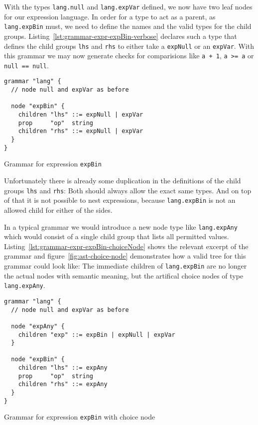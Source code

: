 \documentclass[sigconf,natbib=false,review=true]{acmart}
\begin{document}
With the types \texttt{lang.null} and \texttt{lang.expVar} defined, we now have two leaf nodes for our expression language. In order for a type to act as a parent, as \texttt{lang.expBin} must, we need to define the names and the valid types for the child groups. Listing~\ref{lst:grammar-expr-expBin-verbose} declares such a type that defines the child groups \texttt{lhs} and \texttt{rhs} to either take a \texttt{expNull} or an \texttt{expVar}. With this grammar we may now generate checks for comparisions like \texttt{a + 1}, \texttt{a >= a} or \texttt{null == null}.

\begin{listing}[H]
\begin{verbatim}
grammar "lang" {
  // node null and expVar as before

  node "expBin" {
    children "lhs" ::= expNull | expVar
    prop     "op"  string
    children "rhs" ::= expNull | expVar
  }
}
\end{verbatim}
\caption{Grammar for expression \texttt{expBin}}
\label{lst:grammar-expr-expBin-verbose}
\end{listing}

Unfortunately there is already some duplication in the definitions of the child groups \texttt{lhs} and \texttt{rhs}: Both should always allow the exact same types. And on top of that it is not possible to nest expressions, because \texttt{lang.expBin} is not an allowed child for either of the sides.

In a typical grammar we would introduce a new node type like \texttt{lang.expAny} which would consist of a single child group that lists all permitted values. Listing~\ref{lst:grammar-expr-expBin-choiceNode} shows the relevant excerpt of the grammar and figure~\ref{fig:ast-choice-node} demonstrates how a valid tree for this grammar could look like: The immediate children of \texttt{lang.expBin} are no longer the actual nodes with semantic meaning, but the artifical choice nodes of type \texttt{lang.expAny}.

\begin{listing}[H]
\begin{verbatim}
grammar "lang" {
  // node null and expVar as before

  node "expAny" {
    children "exp" ::= expBin | expNull | expVar
  }

  node "expBin" {
    children "lhs" ::= expAny
    prop     "op"  string
    children "rhs" ::= expAny
  }
}
\end{verbatim}
\caption{Grammar for expression \texttt{expBin} with choice node}
\label{lst:grammar-expr-expBin-choiceNode}
\end{listing}
\end{document}

